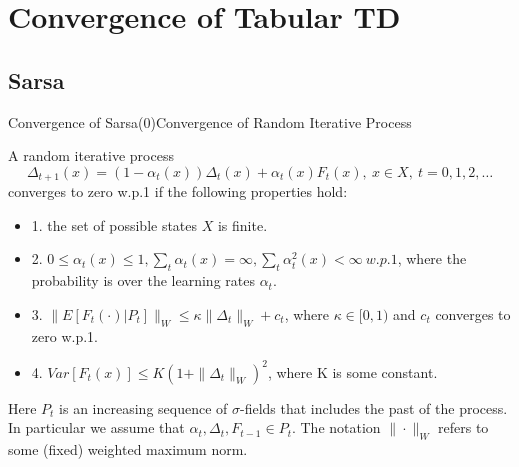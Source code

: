\documentclass{beamer}
\begin{document}
\section{Convergence of Tabular TD}
\subsection{Sarsa}

\begin{frame}{Convergence of Sarsa(0)}{Convergence of Random Iterative Process}
\begin{lemma}
	A random iterative process
	\begin{equation}\label{eq:random-iterarive-process}
		\Delta_{t+1}(x) = (1-\alpha_t(x)) \Delta_{t}(x) + \alpha_t(x)F_t(x), ~x\in X, ~t=0,1,2,\ldots
	\end{equation}
	converges to zero w.p.1 if the following properties hold:
	\small{
	\begin{itemize}
		\item 1. the set of possible states $X$ is finite.
		\item 2. $0 \leq \alpha_t(x) \leq 1, \sum_t \alpha_t(x) = \infty, \sum_t \alpha_t^2(x) < \infty ~ w.p.1$, where the probability is over the learning rates $\alpha_t$.
		\item 3. $\| E[F_t(\cdot) | P_t] \|_W \leq \kappa \| \Delta_{t} \|_W + c_t$, where $\kappa \in [0,1)$ and $c_t$ converges to zero w.p.1.
		\item 4. $Var[F_t(x)] \leq K(1 + \| \Delta_t \|_W)^2$, where K is some constant.
	\end{itemize}
	}
	\tiny{Here $P_t$ is an increasing sequence of $\sigma$-fields that includes the past of the process. In particular we assume that $\alpha_t, \Delta_t, F_{t-1} \in P_t$.
	The notation $\|\cdot\|_W$ refers to some (fixed) weighted maximum norm.}
\end{lemma}
\end{frame}
\end{document}
